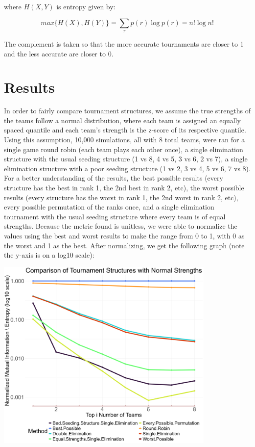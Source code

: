 \documentclass[
  12pt,
]{article}
\begin{document}
where \(H(X,Y)\) is entropy given by:

\[
max\{H(X), H(Y)\} = \sum_{r}  p(r) \log p(r) = n! \log n!
\]

The complement is taken so that the more accurate tournaments are closer
to 1 and the less accurate are closer to 0.

\section{Results}\label{results}

In order to fairly compare tournament structures, we assume the true
strengths of the teams follow a normal distribution, where each team is
assigned an equally spaced quantile and each team's strength is the
z-score of its respective quantile. Using this assumption, 10,000
simulations, all with 8 total teams, were ran for a single game round
robin (each team plays each other once), a single elimination structure
with the usual seeding structure (1 vs 8, 4 vs 5, 3 vs 6, 2 vs 7), a
single elimination structure with a poor seeding structure (1 vs 2, 3 vs
4, 5 vs 6, 7 vs 8). For a better understanding of the results, the best
possible results (every structure has the best in rank 1, the 2nd best
in rank 2, etc), the worst possible results (every structure has the
worst in rank 1, the 2nd worst in rank 2, etc), every possible
permutation of the ranks once, and a single elimination tournament with
the usual seeding structure where every team is of equal strengths.
Because the metric found is unitless, we were able to normalize the
values using the best and worst results to make the range from 0 to 1,
with 0 as the worst and 1 as the best. After normalizing, we get the
following graph (note the y-axis is on a log10 scale):

\includegraphics[width=4.25in,height=\textheight,keepaspectratio]{images/Normal_Information_Curve_Graph.png}
\end{document}
